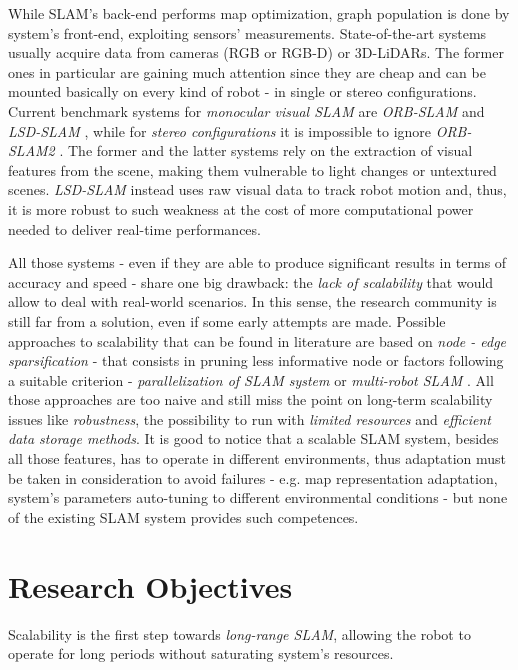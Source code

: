 \documentclass[10pt,a4paper, notitlepage]{report}
\begin{document}
While SLAM's back-end performs map optimization, graph population is done by system's front-end, exploiting sensors' measurements. State-of-the-art systems usually acquire data from cameras (RGB or RGB-D) or 3D-LiDARs. The former ones in particular are gaining much attention since they are cheap and can be mounted basically on every kind of robot - in single or stereo configurations. Current benchmark systems for \textit{monocular visual SLAM} are \textit{ORB-SLAM} \cite{mur2015orb-slam} and \textit{LSD-SLAM} \cite{engel2014lsd-slam}, while for \textit{stereo configurations} it is impossible to ignore \textit{ORB-SLAM2} \cite{mur2017orb-slam2}. The former and the latter systems rely on the extraction of visual features from the scene, making them vulnerable to light changes or untextured scenes. \textit{LSD-SLAM} instead uses raw visual data to track robot motion and, thus, it is more robust to such weakness at the cost of more computational power needed to deliver real-time performances.

All those systems - even if they are able to produce significant results in terms of accuracy and speed - share one big drawback: the \textit{lack of scalability} that would allow to deal with real-world scenarios. In this sense, the research community is still far from a solution, even if some early attempts are made. Possible approaches to scalability that can be found in literature are based on \textit{node - edge sparsification} \cite{kretzschmar2011graph-pruninig} \cite{huang2013consistent} - that consists in pruning less informative node or factors following a suitable criterion - \textit{parallelization of SLAM system} \cite{ni-dallaert2010nested-dissections} \cite{ni-dallaert2007tectonicSAM} \cite{grisetti2010hogman} or \textit{multi-robot SLAM} \cite{cunningham2013ddfSAM2} \cite{lazaro2013mr-slam}. All those approaches are too naive and still miss the point on long-term scalability issues like \textit{robustness}, the possibility to run with \textit{limited resources} and \textit{efficient data storage methods}. It is good to notice that a scalable SLAM system, besides all those features, has to operate in different environments, thus adaptation must be taken in consideration to avoid failures - e.g. map representation adaptation, system's parameters auto-tuning to different environmental conditions - but none of the existing SLAM system provides such competences.

\section*{Research Objectives}
Scalability is the first step towards \textit{long-range SLAM}, allowing the robot to operate for long periods without saturating system's resources. 
\end{document}
